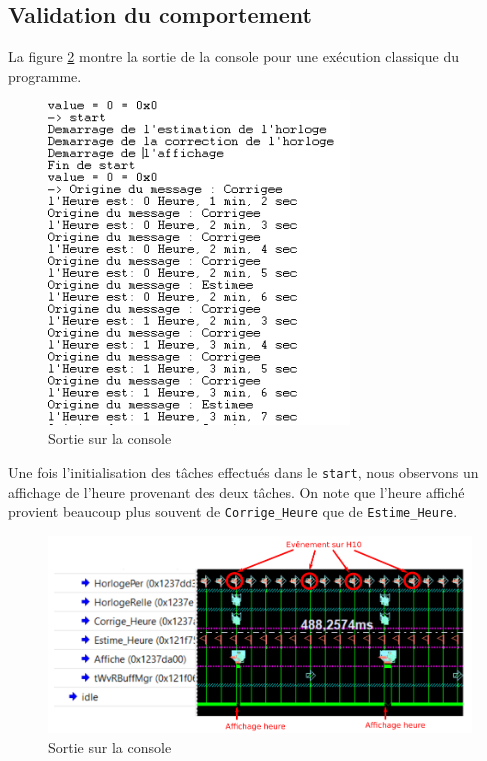 \documentclass[french]{article}
\begin{document}
	\subsection{Validation du comportement}
	
	La figure \ref{fig:affichage_comportement_normal} montre la sortie de la console pour une exécution classique du programme.
	
	\begin{figure}[H]
		\centering
		\includegraphics[width=8cm]{photo/affichage_normal/affichage_comportement_normal}
		\caption{Sortie sur la console}
		\label{fig:affichage_comportement_normal}
	\end{figure}
	
	Une fois l'initialisation des tâches effectués dans le \texttt{start}, nous observons un affichage de l'heure provenant des deux tâches. On note que l'heure affiché provient beaucoup plus souvent de \texttt{Corrige\_Heure} que de \texttt{Estime\_Heure}.
	
	
	\begin{figure}[H]
		\centering
		\includegraphics[width=16cm]{photo/affichage_normal/comportement_normal_fois_3}
		\caption{Sortie sur la console}
		\label{fig:affichage_comportement_normal}
	\end{figure}
	
\end{document}
